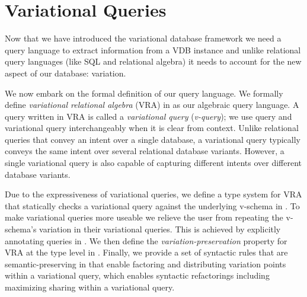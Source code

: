 \chapter{Variational Queries}
\label{ch:vql}

Now that we have introduced the variational database framework 
we need a query language to extract information from a VDB instance
and unlike relational query languages (like SQL and relational algebra)
it needs to account for the new aspect of our database: variation. 

We now embark on the formal definition of our query language. 
We formally define 
\emph{variational relational algebra} (VRA) in 
as our algebraic query language.
A query written in VRA is called a \emph{variational query} (\emph{v-query});
we use query and variational query interchangeably when it is clear from context. 
Unlike relational queries that convey an intent over a single database, 
a variational query typically conveys the same intent over several 
relational database variants. However, a single variational query is also capable of capturing different 
intents over different database variants.

Due to the expressiveness of variational queries, we define a type system for VRA that statically checks a
variational query against the underlying v-schema in .
%
To make variational queries more useable we relieve the user from repeating 
the v-schema's variation in their variational queries. This is achieved by 
explicitly annotating queries in .
We then define the \emph{variation-preservation} property for VRA at
the type level in .
%
Finally, we provide 
a set of syntactic rules that are semantic-preserving 
in  that enable factoring and distributing
variation points within a variational query, which enables syntactic refactorings
including maximizing sharing within a variational query.


